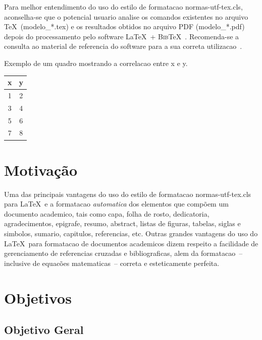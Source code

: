 \documentclass[openright]{normas-utf-tex} %
\begin{document}
Para melhor entendimento do uso do estilo de formatacao {\ttfamily
normas-utf-tex.cls}, aconselha-se que o potencial usuario analise os comandos
existentes no arquivo \TeX\ ({\ttfamily modelo\_*.tex}) e os resultados obtidos
no arquivo PDF ({\ttfamily modelo\_*.pdf}) depois do processamento pelo
software \LaTeX\ + \textsc{Bib}\TeX~\cite{LaTeX2009,BibTeX2009}. Recomenda-se a
consulta ao material de referencia do software para a sua correta
utilizacao~\cite{Lamport1986,Buerger1989,Kopka2003,Mittelbach2004}.

\begin{quadro}[!htb]
	\centering
	\caption[Exemplo de um quadro]{Exemplo de um quadro mostrando a correlacao entre x e y.}
	\label{tab:correlacao}
	\begin{tabular}{cc}
		\hline 
		x & y \\
		\hline
		1 & 2 \\
		3 & 4 \\
		5 & 6 \\
		7 & 8 \\
		\hline 
	\end{tabular}
\end{quadro}

\section{Motivação}

Uma das principais vantagens do uso do estilo de formatacao {\ttfamily
normas-utf-tex.cls} para \LaTeX\ e a formatacao \textit{automatica} dos
elementos que comp\~oem um documento academico, tais como capa, folha de rosto,
dedicatoria, agradecimentos, epigrafe, resumo, abstract, listas de figuras,
tabelas, siglas e simbolos, sumario, capitulos, referencias, etc. Outras
grandes vantagens do uso do \LaTeX\ para formatacao de documentos academicos
dizem respeito a facilidade de gerenciamento de referencias cruzadas e
bibliograficas, alem da formatacao~-- inclusive de equac\~oes  matematicas~--
correta e esteticamente perfeita.

\section{Objetivos}

\subsection{Objetivo Geral}
\end{document}

